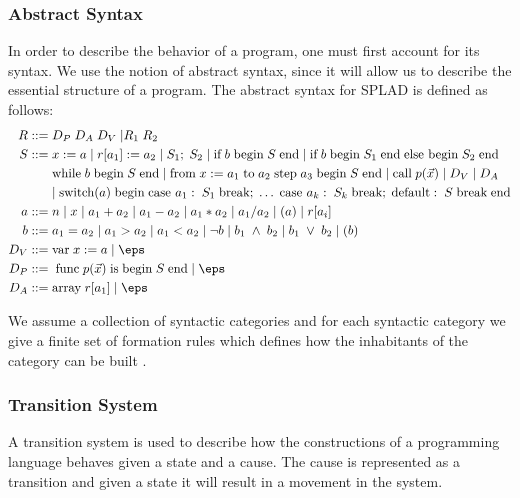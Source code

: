 \subsubsection{Abstract Syntax}
In order to describe the behavior of a program, one must first account for its syntax. We use the notion of abstract syntax, since it will allow us to describe the essential structure of a program. The abstract syntax for SPLAD is defined as follows: 
\begin{align*}
R ::= \; & D_P \; D_A \; D_V \; | R_1 \; R_2 \; \\
S::= \; & x := a \; | \; r[a_1] := a_2 \; | \; S_1; \; S_2 \; | \; \text{if} \; b \; \text{begin} \; S \; \text{end} \; | \; \text{if} \; b \; \text{begin} \; S_1 \; \text{end} \; \text{else begin} \; S_2 \; \text{end} \\
~ & \text{while} \; b \; \text{begin} \; S \; \text{end} \; | \; \text{from} \; x := a_1 \; \text{to} \; a_2 \; \text{step} \; a_3 \; \text{begin} \; S \; \text{end} \; | \; \text{call} \; p(\vec{x}) \; | \; D_V \; | \; D_A \; \\
~ & | \; \text{switch}(a) \; \text{begin} \; \text{case } a_1: \; S_1 \; \text{break}; \; \dots \; \text{case } a_k: \; S_k \; \text{break}; \; \text{default}: \; S \; \text{break} \; \text{end} \\
a::= \; & n \; | \; x \; | \; a_1 + a_2 \; | \; a_1 - a_2 \; | \; a_1 * a_2 \; | \; a_1 / a_2 \; | \; (a) \; | \; r[a_i]\\
b::= \; &a_1 = a_2 \; | \; a_1 > a_2 \; | \; a_1 < a_2 \; | \; \neg b \; | \; b_1 \; \wedge \; b_2 \; | \; b_1 \; \vee \; b_2 \; | \; (b)\\
D_V::= \; & \text{var} \; x := a \;|\; \eps\\
D_P::= \; & \; \text{func} \; p(\vec{x}) \; \text{is} \; \text{begin} \; S \; \text{end}  \;|\; \eps\\
D_A::= \; & \text{array} \; r[a_1]  \;|\; \eps\\
\end{align*}

We assume a collection of syntactic categories and for each syntactic category we give a finite set of formation rules which defines how the inhabitants of the category can be built \citep{HHTree}.

\subsubsection{Transition System}
A transition system is used to describe how the constructions of a programming language behaves given a state and a cause. The cause is represented as a transition and given a state it will result in a movement in the system.

